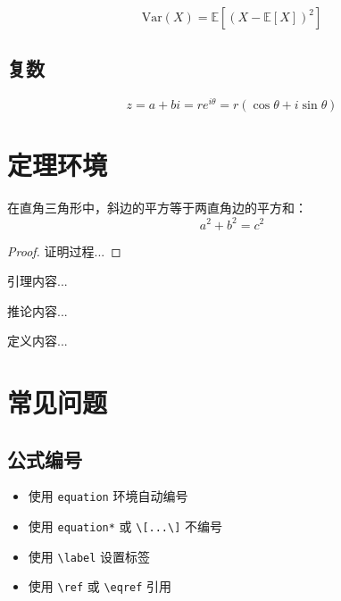 \begin{equation}
  \text{Var}(X) = \mathbb{E}[(X - \mathbb{E}[X])^2]
\end{equation}

\subsection{复数}

\begin{equation}
  z = a + bi = r e^{i\theta} = r(\cos\theta + i\sin\theta)
\end{equation}

\section{定理环境}

\begin{theorem}[勾股定理]
  在直角三角形中，斜边的平方等于两直角边的平方和：
  \begin{equation}
    a^2 + b^2 = c^2
  \end{equation}
\end{theorem}

\begin{proof}
  证明过程...
\end{proof}

\begin{lemma}
  引理内容...
\end{lemma}

\begin{corollary}
  推论内容...
\end{corollary}

\begin{definition}
  定义内容...
\end{definition}

\section{常见问题}

\subsection{公式编号}

\begin{itemize}
  \item 使用 \texttt{equation} 环境自动编号
  \item 使用 \texttt{equation*} 或 \texttt{\textbackslash[...\textbackslash]} 不编号
  \item 使用 \texttt{\textbackslash label} 设置标签
  \item 使用 \texttt{\textbackslash ref} 或 \texttt{\textbackslash eqref} 引用
\end{itemize}

